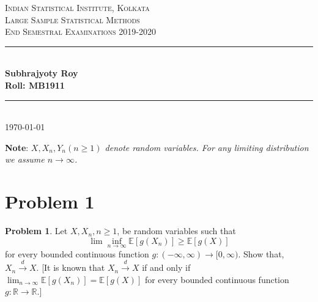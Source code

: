 \documentclass[12pt]{article}
\newcommand{\R}{\mathbb{R}}
\newcommand{\E}{\mathbb{E}}
\newcommand{\HRule}{\rule{\linewidth}{0.5mm}} %
\theoremstyle{definition}
\newtheorem*{prb}{Problem}
\newenvironment{problem}{\begin{tcolorbox}[colback=blue!5!white,colframe=blue!75!black, parbox = true] \begin{prb}  }{\end{prb}\end{tcolorbox} }
\numberwithin{equation}{section}
\begin{document}
\begin{titlepage}
    
\centering
\textsc{\LARGE Indian Statistical Institute, Kolkata}\\[1.5cm] %
\textsc{\Large Large Sample Statistical Methods}\\[0.5cm] %
\textsc{\large End Semestral Examinations 2019-2020}\\[0.5cm] %

\HRule \\[0.4cm]
\large \textbf{Subhrajyoty Roy}\\
\large \textbf{Roll:  MB1911}\\
\HRule \\[1.5cm]
\normalsize \today

\end{titlepage}


\tableofcontents
\clearpage




\textbf{Note}: \textit{$X,X_n,Y_n (n\geq 1)$ denote random variables. For any limiting distribution we assume $n\rightarrow \infty$.}

\section{Problem 1}
\begin{problem}
Let $X,X_n,n\geq 1$, be random variables such that
$$\lim\inf_{n\rightarrow\infty}\E\left[g(X_n)\right] \geq \E\left[g(X)\right]$$
for every bounded continuous function $g:(-\infty,\infty)\rightarrow[0,\infty)$. Show that, $X_n\xrightarrow{d}X$. [It is known that $X_n\xrightarrow{d}X$ if and only if $\displaystyle\lim_{n\rightarrow\infty}\E\left[g(X_n)\right]=\E\left[g(X)\right]$ for every bounded continuous function $g:\R\rightarrow\R$.\big] 
\end{problem}
\end{document}
